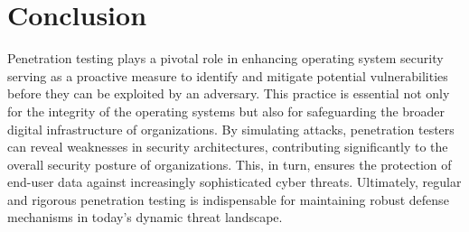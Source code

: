\documentclass[manuscript,acmsmall,anonymous,review,screen,nonacm=true, authorversion=true]{acmart}
\begin{document}
\section{Conclusion}
Penetration testing plays a pivotal role in enhancing operating system security serving as a proactive measure to identify and mitigate potential vulnerabilities before they can be exploited by an adversary. This practice is essential not only for the integrity of the operating systems but also for safeguarding the broader digital infrastructure of organizations. By simulating attacks, penetration testers can reveal weaknesses in security architectures, contributing significantly to the overall security posture of organizations. This, in turn, ensures the protection of end-user data against increasingly sophisticated cyber threats. Ultimately, regular and rigorous penetration testing is indispensable for maintaining robust defense mechanisms in today's dynamic threat landscape.

\clearpage



\end{document}
